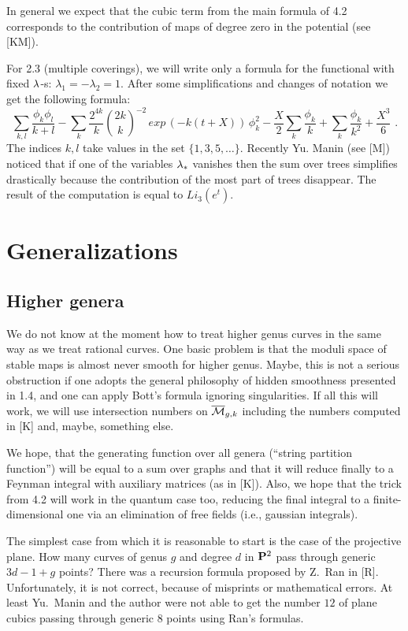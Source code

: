 \documentclass{amsart}
\begin{document}
In general we expect that the cubic term from the main formula of 4.2
  corresponds to the contribution of maps of degree zero in the potential (see
[KM]).


 For 2.3 (multiple coverings), we will write  only a formula for the functional
 with fixed $\l$-s: $\lambda_1=-\lambda_2=1$. After some simplifications and
changes of notation we get the following formula:
$$\sum_{k,l}\frac{\phi_k\phi_l}{k+l}-\sum_k\frac{2^{4k}}{k}{\binom {2k} k
}^{-2}
\,exp\,\left(-k(t+X)\right)\,\phi_k^2-\frac{X}{2}\sum_k \frac{\phi_k}{k}
+\sum_k\frac{\phi_k}{k^2}+\frac{X^3}{6}\,\,.$$
 The indices $k,l$ take values in the set $\{1,3,5,\dots\}$.  Recently Yu.
Manin (see [M]) noticed that if one of the variables $\l_*$ vanishes then the
sum over trees simplifies drastically because the contribution of the most part
of trees disappear. The result of the computation   is equal to $Li_3(e^t)$.


\section{Generalizations}

\subsection{Higher genera}

We do not know at the moment how to treat higher genus curves
in the same way as we treat rational curves. One basic problem is that the
moduli space of stable maps is almost never smooth for higher genus.
  Maybe, this is not a serious obstruction if one adopts the general philosophy
of hidden smoothness presented in 1.4, and one can apply
 Bott's formula ignoring singularities.
 If all this will work, we will use intersection numbers
 on $\M_{g,k}$ including the numbers computed in [K] and, maybe, something
else.

We hope, that the generating function over all genera (``string partition
function'') will be equal to a sum over graphs and that it will reduce finally
to a Feynman integral with auxiliary matrices (as in [K]). Also, we  hope that
the trick from 4.2 will work in the quantum case too, reducing the final
integral to a finite-dimensional one via an elimination of free fields (i.e.,
gaussian integrals).


The simplest case from which it is reasonable to start is the case of the
projective plane. How many curves of genus $g$ and degree $d$ in $\P^2$ pass
through generic $3d-1+g$ points? There was a recursion formula proposed by
Z.~Ran in [R].
 Unfortunately, it is not correct, because of misprints or mathematical errors.
 At least Yu.~Manin and the author were not able to get the number $12$ of
 plane cubics passing through generic $8$ points using Ran's formulas.
\end{document}
